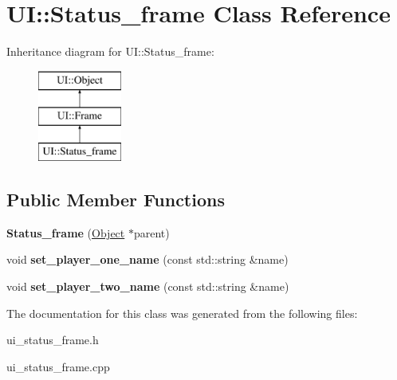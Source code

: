 \hypertarget{class_u_i_1_1_status__frame}{
\section{UI::Status\_\-frame Class Reference}
\label{class_u_i_1_1_status__frame}
}
Inheritance diagram for UI::Status\_\-frame:\begin{figure}[H]
\begin{center}
\leavevmode
\includegraphics[height=3.000000cm]{class_u_i_1_1_status__frame}
\end{center}
\end{figure}
\subsection*{Public Member Functions}
\begin{DoxyCompactItemize}
\item 
\hypertarget{class_u_i_1_1_status__frame_a843de9603d698b98d977856abd014ede}{
{\bfseries Status\_\-frame} (\hyperlink{class_u_i_1_1_object}{Object} $\ast$parent)}
\label{class_u_i_1_1_status__frame_a843de9603d698b98d977856abd014ede}

\item 
\hypertarget{class_u_i_1_1_status__frame_af3c1aa06514ebde345960a86351e62b7}{
void {\bfseries set\_\-player\_\-one\_\-name} (const std::string \&name)}
\label{class_u_i_1_1_status__frame_af3c1aa06514ebde345960a86351e62b7}

\item 
\hypertarget{class_u_i_1_1_status__frame_a22dd434ea36710cc98b3d90212aee447}{
void {\bfseries set\_\-player\_\-two\_\-name} (const std::string \&name)}
\label{class_u_i_1_1_status__frame_a22dd434ea36710cc98b3d90212aee447}

\end{DoxyCompactItemize}


The documentation for this class was generated from the following files:\begin{DoxyCompactItemize}
\item 
ui\_\-status\_\-frame.h\item 
ui\_\-status\_\-frame.cpp\end{DoxyCompactItemize}
